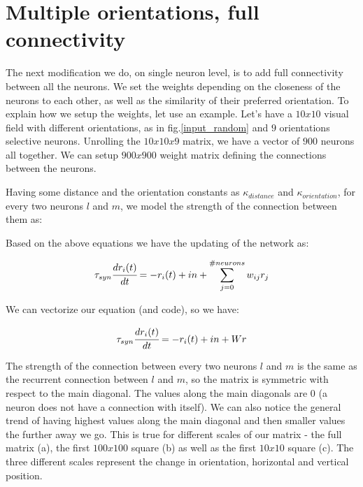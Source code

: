  

\section{Multiple orientations, full connectivity} \label{mult_model}
The next modification we do, on single neuron level, is to add full connectivity between all the neurons. We set the weights depending on the closeness of the neurons to each other, as well as the similarity of their preferred orientation. To explain how we setup the weights, let use an example. Let's have a $10x10$ visual field with different orientations, as in fig.\ref{input_random} and $9$ orientations selective neurons. Unrolling the $10x10x9$ matrix, we have a vector of $900$ neurons all together. We can setup $900x900$ weight matrix defining the connections between the neurons. 

Having some distance and the orientation constants as $\kappa_{distance}$ and $\kappa_{orientation}$, for every two neurons $l$ and $m$, we model the strength of the connection between them as:





Based on the above equations we have the updating of the network as:

\begin{equation}
\tau_{syn}\cfrac{dr_{i}(t)}{dt}=-r_{i}(t)+in+\sum_{j=0}^{\#neurons}w_{ij}r_{j}
\end{equation}

We can vectorize our equation (and code), so we have:

\begin{equation}
\tau_{syn}\cfrac{dr_{i}(t)}{dt}=-r_{i}(t)+in+Wr
\end{equation}

The strength of the connection between every two neurons $l$ and $m$ is the same as the recurrent connection between $l$ and $m$, so the matrix is symmetric with respect to the main diagonal. The values along the main diagonals are $0$ (a neuron does not have a connection with itself). We can also notice the general trend of having highest values along the main diagonal and then smaller values the further away we go. This is true for different scales of our matrix - the full matrix (a), the first $100x100$ square (b) as well as the first $10x10$ square (c). The three different scales represent the change in orientation, horizontal and vertical position.



